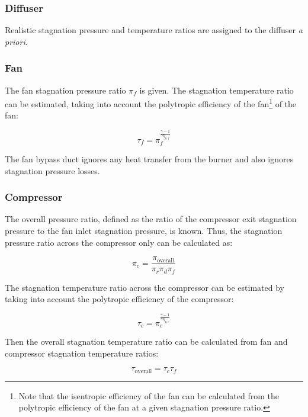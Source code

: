 \documentclass{article}
\begin{document}
\subsubsection{Diffuser}
Realistic stagnation pressure and temperature ratios are assigned to the diffuser \textit{a priori}.

\subsubsection{Fan}
The fan stagnation pressure ratio $\pi_f$ is given. The stagnation temperature ratio can be estimated, taking into account the polytropic efficiency of the fan\footnote{Note that the isentropic efficiency of the fan can be calculated from the polytropic efficiency of the fan at a given stagnation pressure ratio.} of the fan:

\begin{equation*}
\tau_f = \pi_f^{\frac{\gamma-1}{\gamma \eta_{p,f}}}
\end{equation*}

The fan bypass duct ignores any heat transfer from the burner and also ignores stagnation pressure losses.

\subsubsection{Compressor}
The overall pressure ratio, defined as the ratio of the compressor exit stagnation pressure to the fan inlet stagnation pressure, is known. Thus, the stagnation pressure ratio across the compressor only can be calculated as:

\begin{equation*}
\pi_c = \frac{\pi_{\textrm{overall}}}{\pi_r \pi_d \pi_f}
\end{equation*}

The stagnation temperature ratio across the compressor can be estimated by taking into account the polytropic efficiency of the compressor:

\begin{equation*}
\tau_c = \pi_c^{\frac{\gamma-1}{\gamma \eta_{p,c}}}
\end{equation*}

Then the overall stagnation temperature ratio can be calculated from fan and compressor stagnation temperature ratios:

\begin{equation*}
\tau_{\textrm{overall}} = \tau_c \tau_f
\end{equation*}
\end{document}
